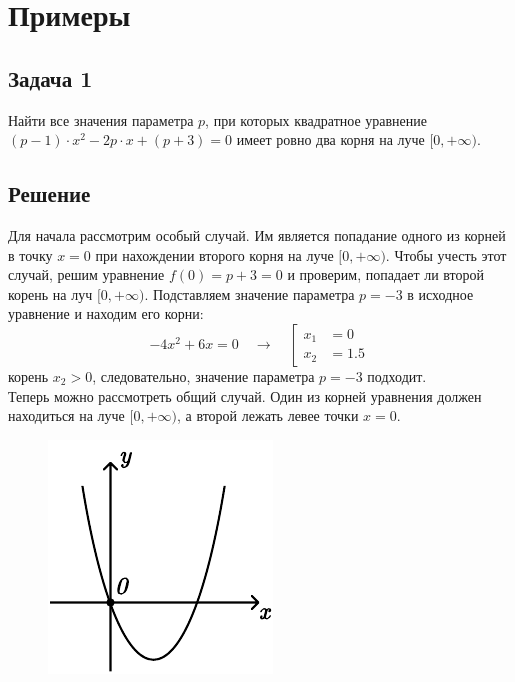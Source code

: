 \section {Примеры}

\subsection * {Задача 1}
Найти все значения параметра $p$, при которых квадратное уравнение
$(p - 1) \cdot x^2 - 2p \cdot x + (p + 3) = 0$ имеет ровно два корня на луче $[0, +\infty)$.

\subsection * {Решение}
Для начала рассмотрим особый случай. Им является попадание одного из корней в точку $x = 0$ при
нахождении второго корня на луче $[0, +\infty)$. Чтобы учесть этот случай, решим уравнение
$f(0) = p + 3 = 0$ и проверим, попадает ли второй корень на луч $[0, +\infty)$. Подставляем
значение параметра $p = -3$ в исходное уравнение и находим его корни:
\begin {equation*}
    -4x^2 + 6x = 0
    \quad\longrightarrow\quad
    \left[
        \begin {aligned}
            x_1 &= 0
            \\
            x_2 &= 1.5
        \end {aligned}
    \right.
\end {equation*}
корень $x_2 > 0$, следовательно, значение параметра $p = -3$ подходит.\\

Теперь можно рассмотреть общий случай. Один из корней уравнения должен находиться на луче
$[0, +\infty)$, а второй лежать левее точки $x = 0$.

\begin {figure} [h]
    \begin {minipage} [t] {\linewidth}
        \centering
        \includegraphics [width=0.3\linewidth] {images/image_16.pdf}
    \end {minipage}
\end {figure}

